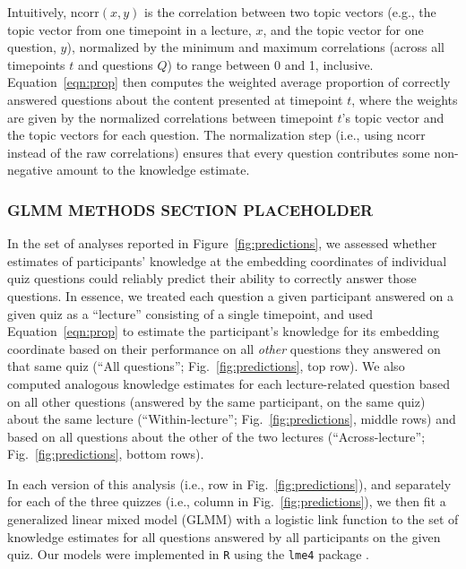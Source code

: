 \documentclass[10pt]{article}
\begin{document}
Intuitively, $\mathrm{ncorr}(x, y)$ is the correlation between two topic
vectors (e.g., the topic vector from one timepoint in a lecture, $x$, and the
topic vector for one question, $y$), normalized by the minimum and maximum
correlations (across all timepoints $t$ and questions $Q$) to range between 0
and 1, inclusive. Equation~\ref{eqn:prop} then computes the weighted average
proportion of correctly answered questions about the content presented at
timepoint $t$, where the weights are given by the normalized correlations
between timepoint $t$'s topic vector and the topic vectors for each question.
The normalization step (i.e., using $\mathrm{ncorr}$ instead of the raw
correlations) ensures that every question contributes some non-negative amount
to the knowledge estimate.

\subsubsection*{GLMM METHODS SECTION PLACEHOLDER}\label{subsec:glmm}

In the set of analyses reported in Figure~\ref{fig:predictions}, we assessed whether estimates of participants' knowledge at the embedding coordinates of individual quiz questions could reliably predict their ability to correctly answer those questions.
In essence, we treated each question a given participant answered on a given quiz as a ``lecture'' consisting of a single timepoint, and used Equation~\ref{eqn:prop} to estimate the participant's knowledge for its embedding coordinate based on their performance on all \textit{other} questions they answered on that same quiz (``All questions''; Fig.~\ref{fig:predictions}, top row).
We also computed analogous knowledge estimates for each lecture-related question based on all other questions (answered by the same participant, on the same quiz) about the same lecture (``Within-lecture''; Fig.~\ref{fig:predictions}, middle rows) and based on all questions about the other of the two lectures (``Across-lecture''; Fig.~\ref{fig:predictions}, bottom rows).

In each version of this analysis (i.e., row in Fig.~\ref{fig:predictions}), and separately for each of the three quizzes (i.e., column in Fig.~\ref{fig:predictions}),  we then fit a generalized linear mixed model (GLMM) with a logistic link function to the set of knowledge estimates for all questions answered by all participants on the given quiz.
Our models were implemented in \texttt{R} using the \texttt{lme4} package \citep{BateEtal15}.
\end{document}
